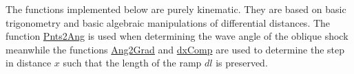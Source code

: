 The functions implemented below are purely kinematic. They are based on basic trigonometry and basic algebraic manipulations of differential distances. The function \url{Pnts2Ang} is used when determining the wave angle of the oblique shock meanwhile the functions \url{Ang2Grad} and \url{dxComp} are used to determine the step in distance $x$ such that the length of the ramp $dl$ is preserved.

